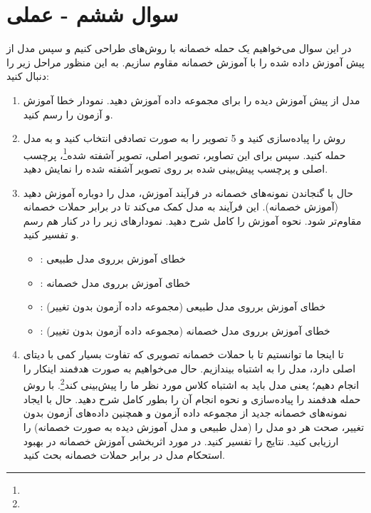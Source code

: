 \section{سوال ششم - عملی}
در این سوال می‌خواهیم یک حمله خصمانه با روش‌های  طراحی کنیم و سپس مدل از پیش آموزش داده شده  را با آموزش خصمانه مقاوم سازیم. به این منظور مراحل زیر را دنبال کنید:


\begin{enumerate}
	\item 
مدل از پیش آموزش دیده  را برای مجموعه داده  آموزش دهید. نمودار خطا آموزش و آزمون را رسم کنید.

	\item 
روش  را پیاده‌سازی کنید و 5 تصویر را به صورت تصادفی انتخاب کنید و به مدل حمله کنید. سپس برای این تصاویر، تصویر اصلی، تصویر آشفته شده\footnote{}، پرچسب اصلی و پرچسب پیش‌بینی شده بر روی تصویر آشفته شده را نمایش دهید.


	\item 
حال با گنجاندن نمونه‌های خصمانه در فرآیند آموزش، مدل  را دوباره آموزش دهید (آموزش خصمانه). این فرآیند به مدل کمک می‌کند تا در برابر حملات خصمانه مقاوم‌تر شود. نحوه آموزش را کامل شرح دهید. نمودارهای زیر را در کنار هم رسم و تفسیر کنید.

	\begin{itemize}
		\item 
		: خطای آموزش برروی مدل طبیعی
		
		\item 
		: خطای آموزش برروی مدل خصمانه
		
		\item 
		: خطای آموزش برروی مدل طبیعی (مجموعه داده آزمون بدون تغییر)
		
		\item 
		: خطای آموزش برروی مدل خصمانه (مجموعه داده آزمون بدون تغییر)
	\end{itemize}
	
	
	\item 
تا اینجا ما توانستیم تا با حملات خصمانه تصویری که تفاوت بسیار کمی با دیتای اصلی دارد، مدل را به اشتباه بیندازیم. حال می‌خواهیم به صورت هدفمند اینکار را انجام دهیم؛ یعنی مدل باید به اشتباه کلاس مورد نظر ما را پیش‌بینی کند\footnote{}. با روش  حمله هدفمند را پیاده‌سازی و نحوه انجام آن را بطور کامل شرح دهید. حال با ایجاد نمونه‌های خصمانه جدید از مجموعه داده آزمون و همچنین داده‌های آزمون بدون تغییر، صحت هر دو مدل را (مدل طبیعی و مدل آموزش دیده به صورت خصمانه) را ارزیابی کنید. نتایج را تفسیر کنید. در مورد اثربخشی آموزش خصمانه در بهبود استحکام مدل در برابر حملات خصمانه بحث کنید.
\end{enumerate}





